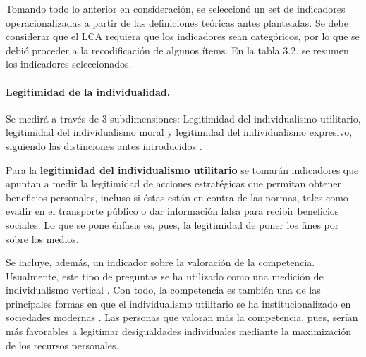 \documentclass[12pt,twoside]{templates/facsothesis}
\begin{document}
Tomando todo lo anterior en consideración, se seleccionó un set de indicadores operacionalizadas a partir de las definiciones teóricas antes planteadas. Se debe considerar que el LCA requiera que los indicadores sean categóricos, por lo que se debió proceder a la recodificación de algunos ítems. En la tabla 3.2. se resumen los indicadores seleccionados.

\hypertarget{legitimidad-de-la-individualidad.}{%
\paragraph{Legitimidad de la individualidad.}\label{legitimidad-de-la-individualidad.}}

Se medirá a través de 3 subdimensiones: Legitimidad del individualismo utilitario, legitimidad del individualismo moral y legitimidad del individualismo expresivo, siguiendo las distinciones antes introducidos \citep{cortois2018}.

Para la \textbf{legitimidad del individualismo utilitario} se tomarán indicadores que apuntan a medir la legitimidad de acciones estratégicas que permitan obtener beneficios personales, incluso si éstas están en contra de las normas, tales como evadir en el transporte público o dar información falsa para recibir beneficios sociales. Lo que se pone énfasis es, pues, la legitimidad de poner los fines por sobre los medios.

Se incluye, además, un indicador sobre la valoración de la competencia. Usualmente, este tipo de preguntas se ha utilizado como una medición de individualismo vertical \citep{oyserman2002}. Con todo, la competencia es también una de las principales formas en que el individualismo utilitario se ha institucionalizado en sociedades modernas \citep{cortois2018}. Las personas que valoran más la competencia, pues, serían más favorables a legitimar desigualdades individuales mediante la maximización de los recursos personales.
\end{document}
